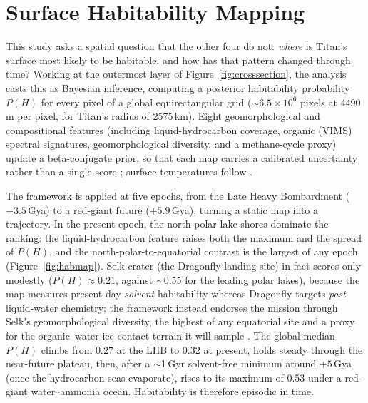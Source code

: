 \section{Surface Habitability Mapping}

This study asks a spatial question that the other four do not: \emph{where} is Titan's surface most likely
to be habitable, and how has that pattern changed through time? Working at the outermost layer of
Figure~\ref{fig:crosssection}, the analysis casts this as Bayesian inference, computing a posterior habitability
probability $P(H)$ for every pixel of a global equirectangular grid ($\sim$$6.5\times10^{6}$ pixels at
4490\,m per pixel, for Titan's radius of 2575\,km). Eight geomorphological and compositional features
(including liquid-hydrocarbon coverage, organic (VIMS) spectral signatures, geomorphological
diversity, and a methane-cycle proxy) update a beta-conjugate prior, so that each map carries a
calibrated uncertainty rather than a single score \citep{Meadows2026}; surface temperatures follow
\citet{Jennings2019}.

The framework is applied at five epochs, from the Late Heavy Bombardment ($-3.5$\,Gya) to a red-giant
future ($+5.9$\,Gya), turning a static map into a trajectory. In the present epoch, the north-polar lake shores
dominate the ranking: the liquid-hydrocarbon feature raises both the maximum and the spread of $P(H)$,
and the north-polar-to-equatorial contrast is the largest of any epoch (Figure~\ref{fig:habmap}). Selk
crater (the Dragonfly landing site) in fact scores only modestly ($P(H)\approx0.21$, against
$\sim0.55$ for the leading polar lakes), because the map measures present-day \emph{solvent}
habitability whereas Dragonfly targets \emph{past} liquid-water chemistry; the framework instead
endorses the mission through Selk's geomorphological diversity, the highest of any equatorial site and a
proxy for the organic--water-ice contact terrain it will sample \citep{Lorenz2021Landing}. The global median
$P(H)$ climbs from $0.27$ at the LHB to $0.32$ at present, holds steady through the near-future plateau, then, after a $\sim$1\,Gyr solvent-free minimum around $+5$\,Gya (once the hydrocarbon
seas evaporate), rises to its maximum of $0.53$ under a red-giant water--ammonia ocean. Habitability is
therefore episodic in time.

